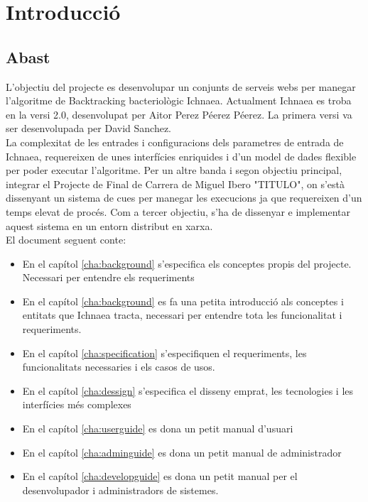 \chapter*{Introducci\'{o}}

\section{Abast}
L'objectiu del projecte es desenvolupar un conjunts de serveis webs per manegar l'algoritme de Backtracking bacteriol\`{o}gic Ichnaea. Actualment Ichnaea es troba en la versi 2.0, desenvolupat per Aitor Perez P\'{e}erez P\'{e}erez. La primera versi va ser desenvolupada per David Sanchez. \\

La complexitat de les entrades i configuracions dels parametres de entrada de Ichnaea, requereixen de unes interf\'{i}cies enriquides i d'un model de dades flexible per poder executar l'algoritme. Per un altre banda i segon objectiu principal, integrar el Projecte de Final de Carrera de Miguel Ibero "TITULO", on s'est\`{a} dissenyant un sistema de cues per manegar les execucions ja que requereixen d'un temps elevat de proc\'{e}s. Com a tercer objectiu, s'ha de dissenyar e implementar aquest sistema en un entorn distribut en xarxa. \\

El document seguent conte:
\begin{itemize}
\item En el cap\'{i}tol \ref{cha:background} s'especifica els conceptes propis del projecte. Necessari per entendre els requeriments
\item En el cap\'{i}tol \ref{cha:background} es fa una petita introducci\'{o} als conceptes i entitats que Ichnaea tracta, necessari per entendre tota les funcionalitat i requeriments.
\item En el cap\'{i}tol \ref{cha:specification} s'especifiquen el requeriments, les funcionalitats necessaries i els casos de usos.
\item En el cap\'{i}tol \ref{cha:dessign} s'especifica el disseny emprat, les tecnologies i les interf\'{i}cies m\'e{s} complexes
\item En el cap\'{i}tol \ref{cha:userguide} es dona un petit manual d'usuari
\item En el cap\'{i}tol \ref{cha:adminguide} es dona un petit manual de administrador
\item En el cap\'{i}tol \ref{cha:developguide} es dona un petit manual per el desenvolupador i administradors de sistemes.
\end{itemize}

